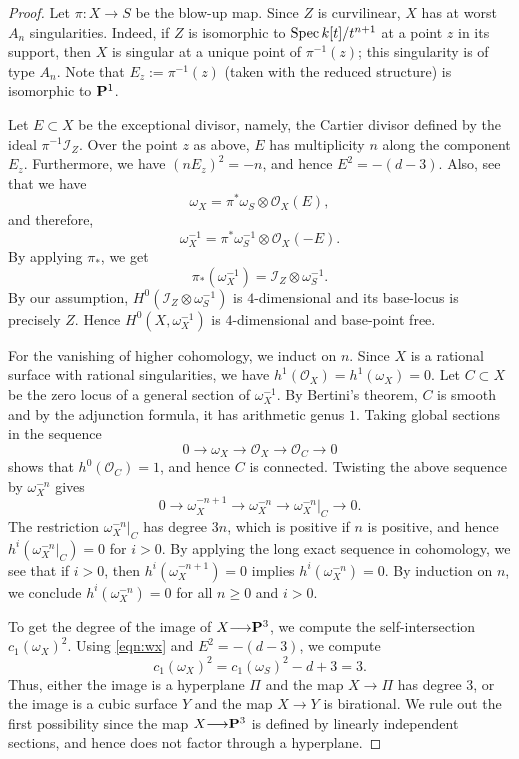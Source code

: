 \documentclass[12pt,reqno]{amsart}
\renewcommand{\to}{{\longrightarrow}}
\numberwithin{equation}{section}
\renewcommand{\O}{\mathcal O}
\begin{document}
\begin{proof}
  Let $\pi \colon X \to S$ be the blow-up map.
  Since $Z$ is curvilinear, $X$ has at worst $A_n$ singularities.
  Indeed, if $Z$ is isomorphic to $\spec k[t]/t^{n+1}$ at a point $z$ in its support, then $X$ is singular at a unique point of $\pi^{-1}(z)$; this singularity is of type $A_n$.
  Note that $E_z := \pi^{-1}(z)$ (taken with the reduced structure) is isomorphic to $\P^1$.
  
  Let $E \subset X$ be the exceptional divisor, namely, the Cartier divisor defined by the ideal $\pi^{-1}\mathcal I_Z$.
  Over the point $z$ as above, $E$ has multiplicity $n$ along the component $E_z$.
  Furthermore, we have $(nE_z)^2 = -n$, and hence $E^2 = -(d-3)$.
  Also, see that we have
  \begin{equation}\label{eqn:wx}
    \omega_X = \pi^* \omega_{S} \otimes \O_X(E),
  \end{equation}
  and therefore,
  \[ \omega_X^{-1} = \pi^* \omega^{-1}_{S} \otimes \O_X(-E).\]
  By applying $\pi_*$, we get
  \[ \pi_* \left( \omega_X^{-1} \right) = \mathcal I_Z \otimes \omega_S^{-1}.\]
  By our assumption, $H^0\left(\mathcal I_Z \otimes \omega_S^{-1}\right)$ is $4$-dimensional and its base-locus is precisely $Z$.
  Hence $H^0\left( X, \omega_X^{-1} \right)$ is $4$-dimensional and base-point free.

  For the vanishing of higher cohomology, we induct on $n$.
  Since $X$ is a rational surface with rational singularities, we have $h^1(\O_X) = h^1(\omega_X) = 0$.
  Let $C \subset X$ be the zero locus of a general section of $\omega_X^{-1}$.
  By Bertini's theorem, $C$ is smooth and by the adjunction formula, it has arithmetic genus $1$.
  Taking global sections in the sequence
  \[ 0 \to \omega_X \to \O_X \to \O_C \to 0\]
  shows that $h^0(\O_C) = 1$, and hence $C$ is connected.
  Twisting the above sequence by $\omega_X^{-n}$ gives
  \[ 0 \to \omega_X^{-n+1} \to \omega_X^{-n} \to \omega_X^{-n}|_C \to 0.\]
  The restriction $\omega_X^{-n}|_C$ has degree $3n$, which is positive if $n$ is positive, and hence $h^i\left(\omega_X^{-n}|_C\right) = 0$ for $i > 0$.
  By applying the long exact sequence in cohomology, we see that if $i > 0$, then $h^i(\omega_X^{-n+1}) = 0$ implies $h^i(\omega_X^{-n}) = 0$.
  By induction on $n$, we conclude $h^i(\omega_X^{-n}) = 0$ for all $n \geq 0$ and $i > 0$.
    
  To get the degree of the image of $X \to \P^3$, we compute the self-intersection $c_1(\omega_X)^2$.
  Using \eqref{eqn:wx} and $E^2 = -(d-3)$, we compute
  \[ c_1(\omega_X)^2 = c_1(\omega_{S})^2 - d + 3 = 3.\]
  Thus, either the image is a hyperplane $\Pi$ and the map $X \to \Pi$ has degree 3, or the image is a cubic surface $Y$ and the map $X \to Y$ is birational.
  We rule out the first possibility since the map $X \to \P^3$ is defined by linearly independent sections, and hence does not factor through a hyperplane.


\end{proof}
\end{document}
